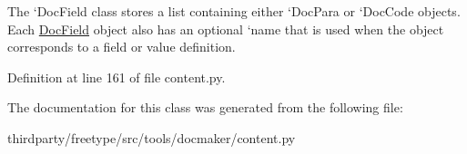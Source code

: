 The `\+Doc\+Field\textquotesingle{} class stores a list containing either `\+Doc\+Para\textquotesingle{} or `\+Doc\+Code\textquotesingle{} objects. Each \hyperlink{classcontent_1_1_doc_field}{Doc\+Field} object also has an optional `name\textquotesingle{} that is used when the object corresponds to a field or value definition. 

Definition at line 161 of file content.\+py.



The documentation for this class was generated from the following file\+:\begin{DoxyCompactItemize}
\item 
thirdparty/freetype/src/tools/docmaker/content.\+py\end{DoxyCompactItemize}

